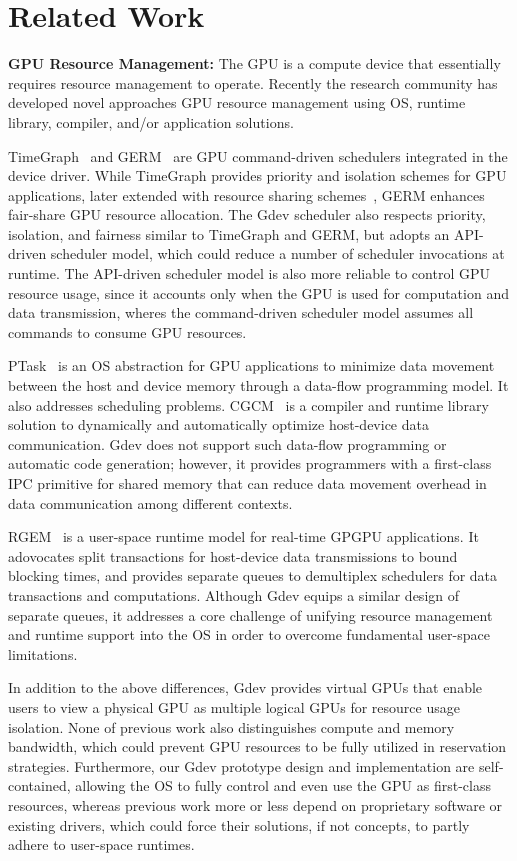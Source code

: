 \section{Related Work}
\label{related_work}

\textbf{GPU Resource Management:}
The GPU is a compute device that essentially requires resource management
to operate.
Recently the research community has developed novel approaches GPU
resource management using OS, runtime library, compiler, and/or
application solutions.

TimeGraph~\cite{Kato_ATC11} and GERM~\cite{Bautin_MCNC08} are GPU
command-driven schedulers integrated in the device driver.
While TimeGraph provides priority and isolation schemes for
GPU applications, later extended with resource sharing
schemes~\cite{Kato_RTAS11}, GERM enhances fair-share GPU resource
allocation.
The Gdev scheduler also respects priority, isolation, and fairness
similar to TimeGraph and GERM, but adopts an API-driven scheduler model,
which could reduce a number of scheduler invocations at runtime.
The API-driven scheduler model is also more reliable to control GPU
resource usage, since it accounts only when the GPU is used
for computation and data transmission, wheres the command-driven
scheduler model assumes all commands to consume GPU resources.

PTask~\cite{Rossbach_SOSP11} is an OS abstraction for GPU applications
to minimize data movement between the host and device memory through
a data-flow programming model.
It also addresses scheduling problems.
CGCM~\cite{Jablin_PLDI11} is a compiler and runtime library solution to
dynamically and automatically optimize host-device data communication.
Gdev does not support such data-flow programming or automatic code
generation; however, it provides programmers with a first-class IPC
primitive for shared memory that can reduce data movement overhead in
data communication among different contexts.

RGEM~\cite{Kato_RTSS11} is a user-space runtime model for real-time
GPGPU applications.
It adovocates split transactions for host-device data transmissions
to bound blocking times, and provides separate queues to demultiplex
schedulers for data transactions and computations.
Although Gdev equips a similar design of separate queues, it
addresses a core challenge of unifying resource management
and runtime support into the OS in order to overcome fundamental
user-space limitations.

In addition to the above differences, Gdev provides virtual GPUs that
enable users to view a physical GPU as multiple logical GPUs for
resource usage isolation.
None of previous work also distinguishes compute and memory bandwidth,
which could prevent GPU resources to be fully utilized in
reservation strategies.
Furthermore, our Gdev prototype design and implementation are
self-contained, allowing the OS to fully control and even use the GPU as
first-class resources, whereas previous work more or less 
depend on proprietary software or existing drivers, which could force their
solutions, if not concepts, to partly adhere to user-space runtimes.

